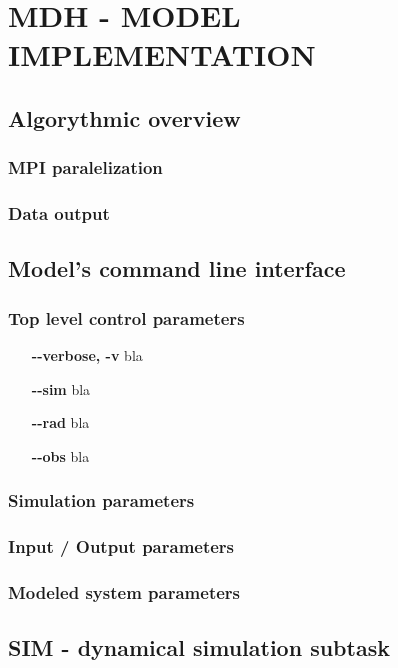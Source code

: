 \chapter{MDH - MODEL IMPLEMENTATION}
\label{chap:model_implementation}
\thispagestyle{empty}

\section{Algorythmic overview}
\subsection{MPI paralelization}
\subsection{Data output}

\section{Model's command line interface}


\subsection{Top level control parameters}
    \begin{itemize}
        \item[\textbf{-{}-verbose, -v}] bla 
        \item[\textbf{-{}-sim}] bla 
        \item[\textbf{-{}-rad}] bla 
        \item[\textbf{-{}-obs}] bla  
    \end{itemize}

\subsection{Simulation parameters}
\subsection{Input / Output parameters}
\subsection{Modeled system parameters}

\section{SIM - dynamical simulation subtask}
